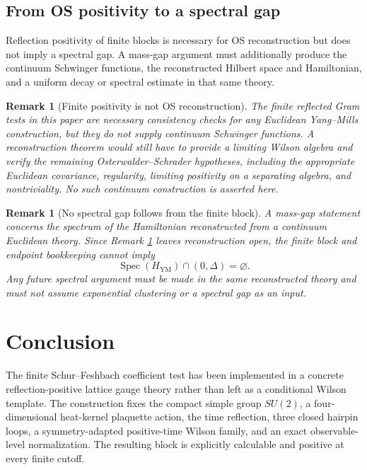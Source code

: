 \documentclass[11pt]{article}
\newtheorem{remark}[theorem]{Remark}
\begin{document}
\subsection{From OS positivity to a spectral gap}

Reflection positivity of finite blocks is necessary for OS reconstruction but does not imply a spectral gap.  A mass-gap argument must additionally produce the continuum Schwinger functions, the reconstructed Hilbert space and Hamiltonian, and a uniform decay or spectral estimate in that same theory.

\begin{remark}[Finite positivity is not OS reconstruction]
\label{rem:finite-positivity-not-reconstruction}
The finite reflected Gram tests in this paper are necessary consistency checks for any Euclidean Yang--Mills construction, but they do not supply continuum Schwinger functions.  A reconstruction theorem would still have to provide a limiting Wilson algebra and verify the remaining Osterwalder--Schrader hypotheses, including the appropriate Euclidean covariance, regularity, limiting positivity on a separating algebra, and nontriviality.  No such continuum construction is asserted here.
\end{remark}

\begin{remark}[No spectral gap follows from the finite block]
\label{rem:no-gap-from-finite-block}
A mass-gap statement concerns the spectrum of the Hamiltonian reconstructed from a continuum Euclidean theory.  Since Remark \ref{rem:finite-positivity-not-reconstruction} leaves reconstruction open, the finite block and endpoint bookkeeping cannot imply
\[
  \operatorname{Spec}(H_{\mathrm{YM}})\cap(0,\Delta)=\varnothing.
\]
Any future spectral argument must be made in the same reconstructed theory and must not assume exponential clustering or a spectral gap as an input.
\end{remark}

\section{Conclusion}

The finite Schur--Feshbach coefficient test has been implemented in a concrete reflection-positive lattice gauge theory rather than left as a conditional Wilson template.  The construction fixes the compact simple group $SU(2)$, a four-dimensional heat-kernel plaquette action, the time reflection, three closed hairpin loops, a symmetry-adapted positive-time Wilson family, and an exact observable-level normalization.  The resulting block is explicitly calculable and positive at every finite cutoff.
\end{document}
